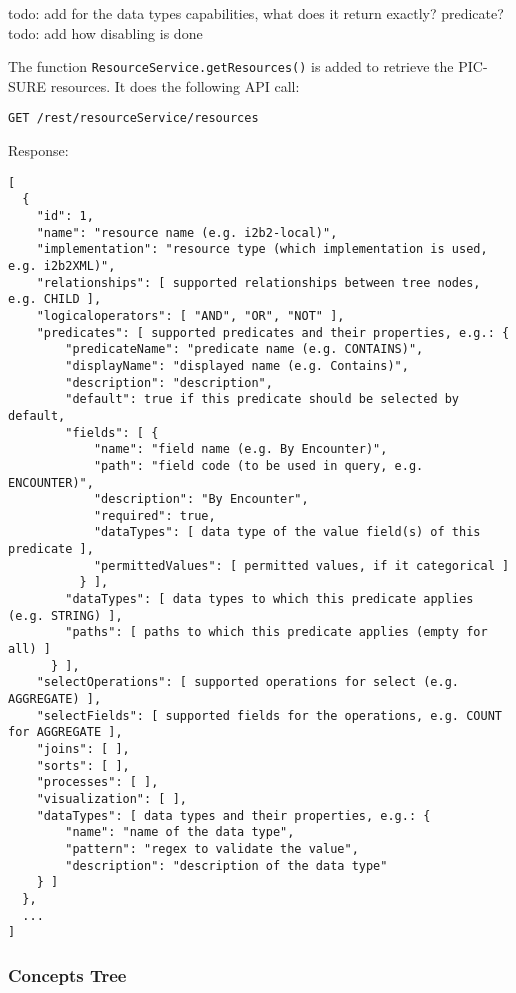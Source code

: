 todo: add for the data types capabilities, what does it return exactly? predicate?
todo: add how disabling is done


The function \verb|ResourceService.getResources()| is added to retrieve the PIC-SURE resources. 
It does the following API call:
\begin{verbatim}
GET /rest/resourceService/resources
\end{verbatim}

Response:
\begin{verbatim}
[
  {
    "id": 1,
    "name": "resource name (e.g. i2b2-local)",
    "implementation": "resource type (which implementation is used, e.g. i2b2XML)",
    "relationships": [ supported relationships between tree nodes, e.g. CHILD ],
    "logicaloperators": [ "AND", "OR", "NOT" ],
    "predicates": [ supported predicates and their properties, e.g.: {
        "predicateName": "predicate name (e.g. CONTAINS)",
        "displayName": "displayed name (e.g. Contains)",
        "description": "description",
        "default": true if this predicate should be selected by default,
        "fields": [ {
            "name": "field name (e.g. By Encounter)",
            "path": "field code (to be used in query, e.g. ENCOUNTER)",
            "description": "By Encounter",
            "required": true,
            "dataTypes": [ data type of the value field(s) of this predicate ],
            "permittedValues": [ permitted values, if it categorical ]
          } ],
        "dataTypes": [ data types to which this predicate applies (e.g. STRING) ],
        "paths": [ paths to which this predicate applies (empty for all) ]
      } ],
    "selectOperations": [ supported operations for select (e.g. AGGREGATE) ],
    "selectFields": [ supported fields for the operations, e.g. COUNT for AGGREGATE ],
    "joins": [ ],
    "sorts": [ ],
    "processes": [ ],
    "visualization": [ ],
    "dataTypes": [ data types and their properties, e.g.: {
        "name": "name of the data type",
        "pattern": "regex to validate the value",
        "description": "description of the data type"
    } ]
  },
  ...
]
\end{verbatim}


\subsubsection{Concepts Tree}

